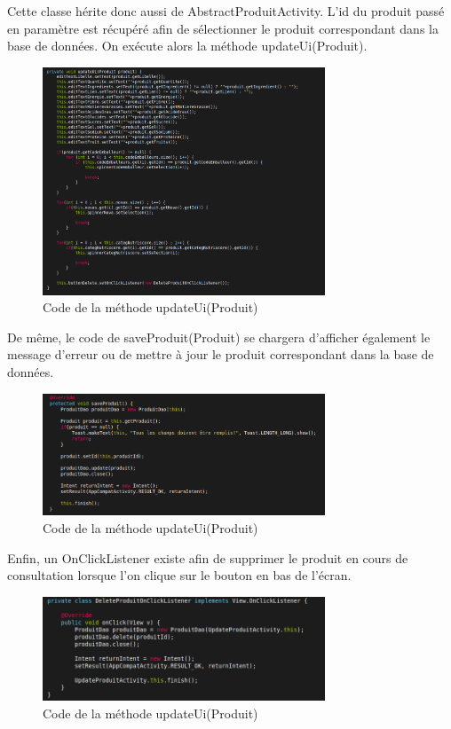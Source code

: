 \documentclass[report]{BetterDocument}
\newcommand{\bdd}{base de données}
\begin{document}
			Cette classe hérite donc aussi de AbstractProduitActivity. L'id du produit passé en paramètre est récupéré afin de sélectionner le produit correspondant dans la \bdd{}. On exécute alors la méthode updateUi(Produit).

			\begin{figure}[H]
				\centering\includegraphics[width=0.75\textwidth, keepaspectratio]{img/activity/UpdateProduitActivity/updateUi.png}
				\caption{Code de la méthode updateUi(Produit)}
			\end{figure}

			De même, le code de saveProduit(Produit) se chargera d'afficher également le message d'erreur ou de mettre à jour le produit correspondant dans la \bdd{}.

			\begin{figure}[H]
				\centering\includegraphics[width=0.75\textwidth, keepaspectratio]{img/activity/UpdateProduitActivity/save.png}
				\caption{Code de la méthode updateUi(Produit)}
			\end{figure}

			Enfin, un OnClickListener existe afin de supprimer le produit en cours de consultation lorsque l'on clique sur le bouton en bas de l'écran.

			\begin{figure}[H]
				\centering\includegraphics[width=0.75\textwidth, keepaspectratio]{img/activity/UpdateProduitActivity/delete.png}
				\caption{Code de la méthode updateUi(Produit)}
			\end{figure}
\end{document}
